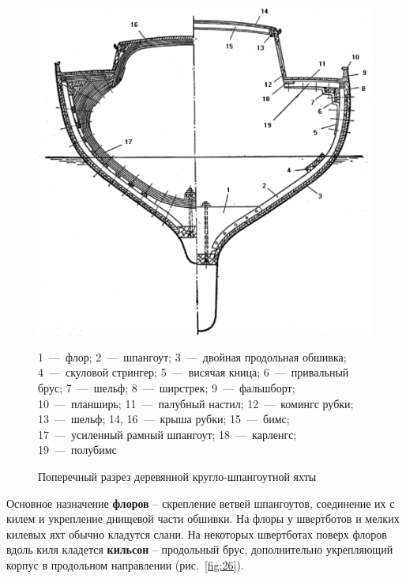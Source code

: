 \documentclass[a4paper, 12pt, twoside, final]{scrbook}
\begin{document}
\begin{figure}[htbp]
\begin{centering}
\includegraphics{Razrez_1}
\par\end{centering}

\protect\caption{\label{fig:27}Поперечный разрез деревянной кругло-шпангоутной яхты}


\begin{centering}\small
1~---~флор; 2~---~шпангоут; 3~---~двойная продольная обшивка; 4~---~скуловой
стрингер; 5~---~висячая кница; 6~---~привальный брус; 7~---~шельф; 8~---~ширстрек;
9~---~фальшборт; 10~---~планширь; 11~---~палубный настил; 12~---~комингс рубки;
13~---~шельф; 14, 16~---~крыша рубки; 15~---~бимс; 17~---~усиленный рамный
шпангоут; 18~---~карленгс; 19~---~полубимс
\par\end{centering}

\end{figure}


Основное назначение \textbf{флоров} \--- скрепление ветвей шпангоутов,
соединение их с килем и укрепление днищевой части обшивки. На флоры
у швертботов и мелких килевых яхт обычно кладутся слани. На некоторых
швертботах поверх флоров вдоль киля кладется \textbf{кильсон} \--- продольный
брус, дополнительно укрепляющий корпус в продольном направлении (рис.~\ref{fig:26}).
\end{document}
